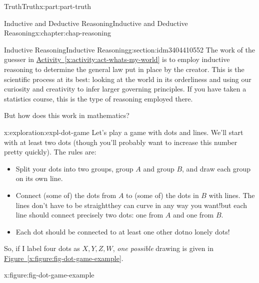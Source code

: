 \documentclass[oneside,10pt,]{book}
\newcommand{\xreffont}{\relax}
\numberwithin{equation}{section}
\begin{document}
\begin{partptx}{Truth}{}{Truth}{}{}{x:part:part-truth}
\begin{chapterptx}{Inductive and Deductive Reasoning}{}{Inductive and Deductive Reasoning}{}{}{x:chapter:chap-reasoning}
\begin{sectionptx}{Inductive Reasoning}{}{Inductive Reasoning}{}{}{g:section:idm3404410552}
The work of the guesser in \hyperref[x:activity:act-whats-my-world]{Activity~{\xreffont\ref{x:activity:act-whats-my-world}}} is to employ inductive reasoning to determine the general law put in place by the creator. This is the scientific process at its best: looking at the world in its orderliness and using our curiosity and creativity to infer larger governing principles. If you have taken a statistics course, this is the type of reasoning employed there.%
\par
But how does this work in mathematics?%
\begin{exploration}{}{x:exploration:expl-dot-game}%
Let's play a game with dots and lines. We'll start with at least two dots (though you'll probably want to increase this number pretty quickly). The rules are:%
%
\begin{itemize}[label=\textbullet]
\item{}Split your dots into two groups, group \(A\) and group \(B\), and draw each group on its own line.%
\item{}Connect (some of) the dots from \(A\) to (some of) the dots in \(B\) with lines. The lines don't have to be straight\textemdash{}they can curve in any way you want!\textemdash{}but each line should connect precisely two dots: one from \(A\) and one from \(B\).%
\item{}Each dot should be connected to at least one other dot\textemdash{}no lonely dots!%
\end{itemize}
So, if I label four dots as \(X, Y, Z, W\), \emph{one possible} drawing is given in \hyperref[x:figure:fig-dot-game-example]{Figure~{\xreffont\ref{x:figure:fig-dot-game-example}}}.%
\begin{figureptx}{}{x:figure:fig-dot-game-example}{}%
\begin{image}{0.325}{0.35}{0.325}%

\end{image}
\end{figureptx}
\end{exploration}
\end{sectionptx}
\end{chapterptx}
\end{partptx}
\end{document}
